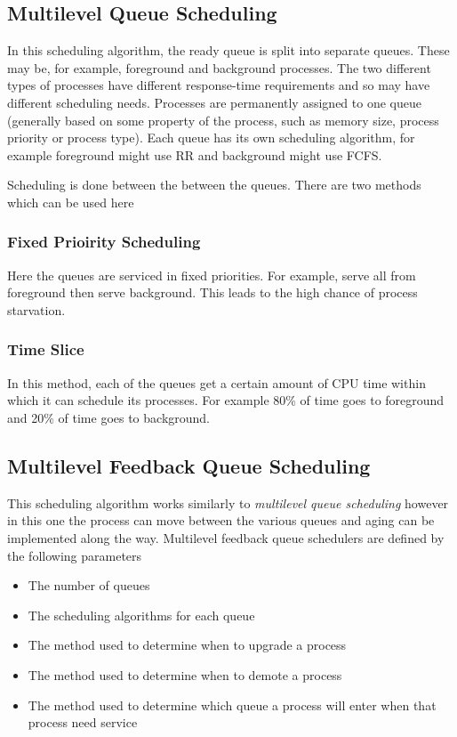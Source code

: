 \subsection*{Multilevel Queue Scheduling}
In this scheduling algorithm, the ready queue is split into separate queues. These may be, for example, foreground and background processes. The two different types of processes have different response-time requirements and so may have different scheduling needs. Processes are permanently assigned to one queue (generally based on some property of the process, such as memory size, process priority or process type). Each queue has its own scheduling algorithm, for example foreground might use RR and background might use FCFS. 

Scheduling is done between the between the queues. There are two methods which can be used here
\subsubsection*{Fixed Prioirity Scheduling}
Here the queues are serviced in fixed priorities. For example, serve all from foreground then serve background. This leads to the high chance of process starvation. 
\subsubsection*{Time Slice}
In this method, each of the queues get a certain amount of CPU time within which it can schedule its processes. For example 80\% of time goes to foreground and 20\% of time goes to background.

\subsection*{Multilevel Feedback Queue Scheduling}
This scheduling algorithm works similarly to \textit{multilevel queue scheduling} however in this one the process can move between the various queues and aging can be implemented along the way. Multilevel feedback queue schedulers are defined by the following parameters
\begin{itemize}
    \item The number of queues
    \item The scheduling algorithms for each queue
    \item The method used to determine when to upgrade a process
    \item The method used to determine when to demote a process
    \item The method used to determine which queue a process will enter when that process need service
\end{itemize}
